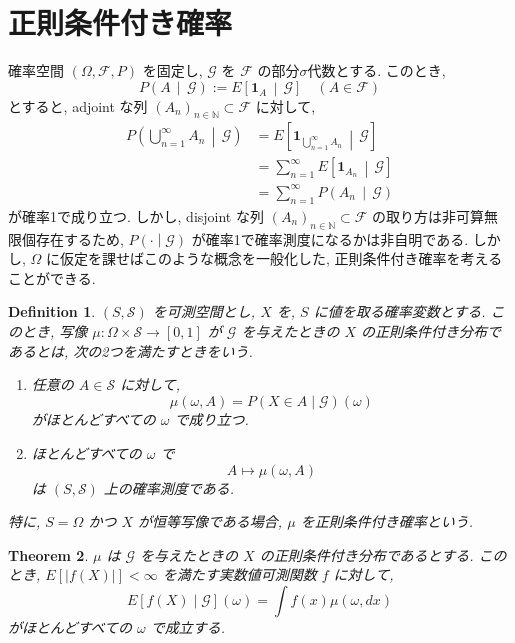 \documentclass[11pt]{article}
\theoremstyle{breakstyle}
\newtheorem{theorem}{Theorem}[section]
\newtheorem{definition}[theorem]{Definition}
\newcommand{\ind}[1]{\mathbf{1}_{#1}}
\begin{document}
\section{正則条件付き確率}
確率空間 $(\Omega, \mathcal{F}, P)$ を固定し, $\mathcal{G}$ を $\mathcal{F}$ の部分$\sigma$代数とする.
このとき, 
\begin{equation*}
    P\left(A\,\middle|\,\mathcal{G}\right)
    :=E\left[\ind{A}\,\middle|\,\mathcal{G}\right]
    \quad \left(A\in\mathcal{F}\right)
\end{equation*}
とすると, adjoint な列 $(A_n)_{n\in\mathbb{N}}\subset \mathcal{F}$ に対して, 
\begin{align*}
    P\left(\bigcup_{n=1}^{\infty}A_n\,\middle|\,\mathcal{G}\right)
    &=E\left[\ind{\bigcup_{n=1}^{\infty}A_n}\,\middle|\,\mathcal{G}\right]\\
    &=\sum_{n=1}^{\infty}E\left[\ind{A_n}\,\middle|\,\mathcal{G}\right]\\
    &=\sum_{n=1}^{\infty}P\left(A_n\,\middle|\,\mathcal{G}\right)
\end{align*}
が確率1で成り立つ. しかし, disjoint な列 $(A_n)_{n\in\mathbb{N}}\subset \mathcal{F}$ の取り方は非可算無限個存在するため, 
$P\left(\cdot\middle|\mathcal{G}\right)$ が確率1で確率測度になるかは非自明である.
しかし, $\Omega$ に仮定を課せばこのような概念を一般化した, 正則条件付き確率を考えることができる.
\begin{definition}
    $(S,\mathcal{S})$ を可測空間とし, $X$ を, $S$ に値を取る確率変数とする.
    このとき, 写像 $\mu: \Omega\times\mathcal{S}\rightarrow[0,1]$ が $\mathcal{G}$ を与えたときの $X$
    の正則条件付き分布であるとは, 次の2つを満たすときをいう.
    \begin{enumerate}
        \item 任意の $A\in\mathcal{S}$ に対して, 
        \begin{equation*}
            \mu(\omega,A)=P\left(X\in A\middle|\mathcal{G}\right)(\omega)
        \end{equation*}
        がほとんどすべての $\omega$ で成り立つ.
        \item ほとんどすべての $\omega$ で
        \begin{equation*}
            A\mapsto\mu(\omega,A)
        \end{equation*}
        は $(S,\mathcal{S})$ 上の確率測度である.
    \end{enumerate}
    特に, $S=\Omega$ かつ $X$ が恒等写像である場合, $\mu$ を正則条件付き確率という.
\end{definition}
\begin{theorem}
    $\mu$ は $\mathcal{G}$ を与えたときの $X$ の正則条件付き分布であるとする. このとき, 
    $E\left[\left|f(X)\right|\right]<\infty$ を満たす実数値可測関数 $f$ に対して, 
    \begin{equation*}
        E\left[f(X)\middle|\mathcal{G}\right](\omega)=\int f(x)\mu(\omega,dx)
    \end{equation*}
    がほとんどすべての $\omega$ で成立する.
\end{theorem}
\end{document}
